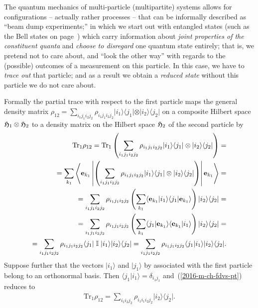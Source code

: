 The quantum mechanics of multi-particle (multipartite) systems allows for configurations -- actually rather processes --
that can be informally described as ``beam dump experiments;'' in which we start out with entangled states
(such as the Bell states on page~\pageref{2014-m-ch-fdvs-bellbasis})  which carry information
about {\em joint properties of the constituent quanta}
and {\em choose to disregard} one quantum state entirely; that is, we pretend
not to care about, and ``look the other way'' with regards to the (possible) outcomes of a measurement on this particle.
In this case, we have to {\em trace out} that particle; and as a result we obtain a {\em reduced state} without this particle we do
not care about.

Formally the partial trace with respect to the first particle
maps the general density matrix
${ \rho}_{12} = \sum_{i_1 j_1 i_2 j_2} \rho_{i_1 j_1 i_2 j_2}   \vert i_1\rangle \langle j_1\vert \otimes \vert i_2\rangle \langle j_2 \vert$
on a composite Hilbert space
$
{\frak H}_1
\otimes
{\frak H}_2
$
to  a density matrix on the Hilbert space
${\frak H}_2
$ of the second particle by
\begin{equation}
\begin{split}
\textrm{Tr}_1
{ \rho}_{12}
= \textrm{Tr}_1  \left(   \sum_{i_1 j_1 i_2 j_2} \rho_{i_1 j_1 i_2 j_2}   \vert i_1\rangle \langle j_1\vert \otimes \vert i_2 \rangle \langle j_2 \vert \right)
=\\
= \sum_{k_1}   \left\langle {\bf e}_{k_1}  \left\vert \left(   \sum_{i_1 j_1 i_2 j_2} \rho_{i_1 j_1 i_2 j_2}
 \vert i_1\rangle \langle j_1\vert \otimes \vert i_2 \rangle \langle j_2 \vert  \right)  \right\vert {\bf e}_{k_1} \right\rangle
=\\
=  \sum_{i_1 j_1 i_2 j_2} \rho_{i_1 j_1 i_2 j_2}  \left( \sum_{k_1}
 \langle {\bf e}_{k_1}  \vert i_1\rangle \langle j_1\vert    {\bf e}_{k_1}  \rangle  \right)  \vert i_2 \rangle \langle j_2 \vert
=\\
=  \sum_{i_1 j_1 i_2 j_2} \rho_{i_1 j_1 i_2 j_2}  \left( \sum_{k_1}
 \langle j_1\vert    {\bf e}_{k_1}  \rangle  \langle {\bf e}_{k_1}  \vert i_1\rangle \right)  \vert i_2 \rangle \langle j_2 \vert
=\\
=  \sum_{i_1 j_1 i_2 j_2} \rho_{i_1 j_1 i_2 j_2}
 \langle j_1\vert   \; {\Bbb I} \; \vert i_1\rangle   \vert i_2 \rangle \langle j_2 \vert
=  \sum_{i_1 j_1 i_2 j_2} \rho_{i_1 j_1 i_2 j_2}
 \langle j_1 \vert  i_1\rangle    \vert i_2 \rangle \langle j_2 \vert
.
\end{split}
\label{2016-m-ch-fdvs-pt}
\end{equation}
Suppose further that the vectors
$\vert i_1 \rangle$
and
$\vert j_1 \rangle$
by   associated with the first particle
belong to an orthonormal basis.
Then $\langle j_1 \vert  i_1\rangle =\delta_{i_1 j_1}$ and~(\ref{2016-m-ch-fdvs-pt})
reduces to
\begin{equation}
\begin{split}
\textrm{Tr}_1
{ \rho}_{12}
=  \sum_{i_1 i_2 j_2} \rho_{i_1 i_1 i_2 j_2}
  \vert i_2 \rangle \langle j_2 \vert
.
\end{split}
\label{2016-m-ch-fdvs-pt2}
\end{equation}

